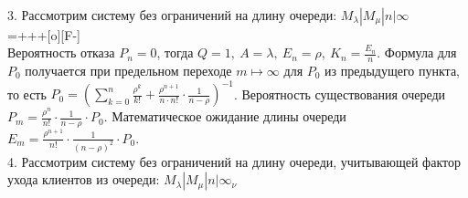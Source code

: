 \documentclass{article}
\begin{document}
\vspace{\baselineskip}
\\
3. Рассмотрим систему без ограничений на длину очереди:
\begin{math}M_{\lambda}|M_{\mu}|n|\infty\end{math}
\vspace{\baselineskip}
\\
\entrymodifiers={+++[o][F-]}
\vspace{\baselineskip}
\\
Вероятность отказа \begin{math}P_n = 0\end{math}, тогда \begin{math}Q = 1, \ A = \lambda, \ E_n = \rho, \ K_n = \displaystyle\frac{E_n}{n}\end{math}. Формула для \begin{math}P_0\end{math} получается при предельном переходе \begin{math}m \mapsto \infty\end{math} для \begin{math}P_0\end{math} из предыдущего пункта, то есть \begin{math} P_0 = \left(\displaystyle\sum^n_{k=0} \displaystyle\frac{\rho^k}{ k!} + \displaystyle\frac{\rho^{n+1}}{n \cdot n!} \cdot\displaystyle\frac{1 }{n  - \rho} \right)^{-1}\end{math}. Вероятность существования очереди \begin{math}P_m = \displaystyle\frac{\rho^n}{n!} \cdot \displaystyle\frac{1}{n - \rho} \cdot P_0\end{math}. Математическое ожидание длины очереди \begin{math}E_m = \displaystyle\frac{\rho^{n+1}}{n!} \cdot \displaystyle\frac{1}{(n - \rho)^2} \cdot P_0\end{math}.
\vspace{\baselineskip}
\\
4. Рассмотрим систему без ограничений на длину очереди, учитывающей
фактор ухода клиентов из очереди: \begin{math}M_{\lambda}|M_{\mu}|n|\infty_\nu\end{math}
\end{document}

